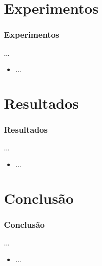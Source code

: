 \documentclass[10pt, pdf,xcolor=pdftex,dvipsnames,table]{beamer}
\begin{document}
\section{Experimentos}
\begin{frame} \frametitle{Experimentos}
    \begin{block}{...}
        \begin{itemize}
        	\item ...
        \end{itemize}
    \end{block}
\end{frame}

\section{Resultados}
\begin{frame} \frametitle{Resultados}
    \begin{block}{...}
        \begin{itemize}
        	\item ...
        \end{itemize}
    \end{block}
\end{frame}

\section{Conclusão}
\begin{frame} \frametitle{Conclusão}
    \begin{block}{...}
        \begin{itemize}
        	\item ...
        \end{itemize}
    \end{block}
\end{frame}

\end{document}
